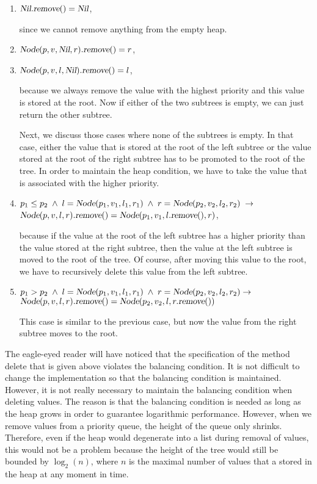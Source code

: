 \begin{enumerate}
\item $\textsl{Nil}.\textsl{remove}() = \textsl{Nil}$,

      since we cannot remove anything from the empty heap.
\item $\textsl{Node}(p,v,\textsl{Nil},r).\textsl{remove}() = r$,
  
\item $\textsl{Node}(p,v,l,\textsl{Nil}).\textsl{remove}() = l$,

      because we always remove the value with the highest priority and this value is stored at the
      root.  Now if either of the two subtrees is empty, we can just return the other subtree.

      Next, we discuss those cases where none of the subtrees is empty.
      In that case, either the value that is stored at the root of the left subtree or the value
      stored at the root of the right subtree has to be promoted to the root of the tree.
      In order to maintain the heap condition, we have to take the value that is associated with the
      higher priority.
\item $p_1 \leq p_2 \;\wedge\; l = \textsl{Node}(p_1,v_1,l_1,r_1) \;\wedge\; r =
      \textsl{Node}(p_2,v_2,l_2,r_2) \;\rightarrow$ \\[0.1cm] 
      \hspace*{1.3cm} 
      $\textsl{Node}(p,v,l,r).\textsl{remove}() =      \textsl{Node}(p_1,v_1,l.\textsl{remove}(),r)$,

      because if the value at the root of the left subtree has a higher priority than the value
      stored at the right subtree, then the value at the left subtree is moved to the root of the tree.
      Of course, after moving this value to the root, we have to recursively delete this value from
      the left subtree.
\item $p_1 > p_2 \;\wedge\; l = \textsl{Node}(p_1,v_1,l_1,r_1) \;\wedge\; r = \textsl{Node}(p_2,v_2,l_2,r_2) \rightarrow$ \\[0.1cm]
      \hspace*{1.3cm} 
      $\textsl{Node}(p,v,l,r).\textsl{remove}() = \textsl{Node}(p_2,v_2,l,r.\textsl{remove}())$

      This case is similar to the previous case, but now the value from the right subtree moves to
      the root.
\end{enumerate}
The eagle-eyed reader will have noticed that the specification of the method delete that is given
above violates the balancing condition.  It is not difficult to change the implementation so that
the balancing condition is maintained.  However, it is not really necessary to maintain the
balancing condition when deleting values.  The reason is that the balancing condition is needed as
long as the heap grows in order to guarantee logarithmic  performance.  However, when we remove
values from a priority queue, the height of the queue only shrinks.  Therefore, even if the heap
would degenerate into a list during removal of values, this would not be a problem because the
height of the tree would still be bounded by $\log_2(n)$, where $n$ is the maximal number of
values that a stored in the heap at any moment in time.

